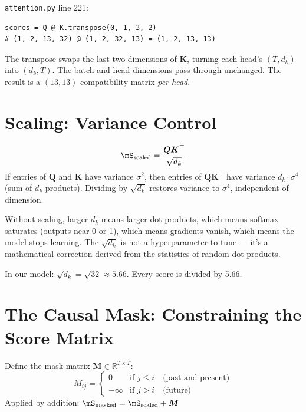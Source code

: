 \documentclass[11pt, a4paper]{article}
\newcommand{\R}{\mathbb{R}}
\newcommand{\mQ}{\bm{Q}}
\newcommand{\mK}{\bm{K}}
\begin{document}
\begin{transformer}
\texttt{attention.py} line 221:
\begin{verbatim}
scores = Q @ K.transpose(0, 1, 3, 2)
# (1, 2, 13, 32) @ (1, 2, 32, 13) = (1, 2, 13, 13)
\end{verbatim}
The transpose swaps the last two dimensions of $\mK$, turning each head's
$(T, d_k)$ into $(d_k, T)$. The batch and head dimensions pass through unchanged.
The result is a $(13, 13)$ compatibility matrix \textit{per head}.
\end{transformer}

\section{Scaling: Variance Control}

\begin{formaldef}
\[
\mS_{\text{scaled}} = \frac{\mQ \mK^\top}{\sqrt{d_k}}
\]
If entries of $\mQ$ and $\mK$ have variance $\sigma^2$, then entries of $\mQ\mK^\top$
have variance $d_k \cdot \sigma^4$ (sum of $d_k$ products). Dividing by $\sqrt{d_k}$
restores variance to $\sigma^4$, independent of dimension.
\end{formaldef}

\begin{intuition}
Without scaling, larger $d_k$ means larger dot products, which means softmax
saturates (outputs near 0 or 1), which means gradients vanish, which means
the model stops learning. The $\sqrt{d_k}$ is not a hyperparameter to tune ---
it's a mathematical correction derived from the statistics of random dot products.

In our model: $\sqrt{d_k} = \sqrt{32} \approx 5.66$. Every score is divided by 5.66.
\end{intuition}

\section{The Causal Mask: Constraining the Score Matrix}

\begin{formaldef}
Define the mask matrix $\bm{M} \in \R^{T \times T}$:
\[
M_{ij} = \begin{cases}
0 & \text{if } j \leq i \quad \text{(past and present)} \\
-\infty & \text{if } j > i \quad \text{(future)}
\end{cases}
\]
Applied by addition: $\mS_{\text{masked}} = \mS_{\text{scaled}} + \bm{M}$
\end{formaldef}
\end{document}
